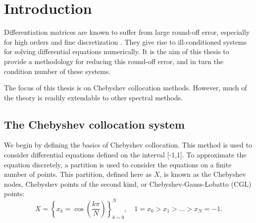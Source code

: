 \documentclass{sfuthesis}
\begin{document}
%
%

\mainmatter%

%


\chapter{Introduction} \label{intro}

Differentiation matrices are known to suffer from large round-off error, especially for high orders and fine discretization \cite{BB1999errors}.
They give rise to ill-conditioned systems for solving differential equations numerically.
It is the aim of this thesis to provide a methodology for reducing this round-off error, and in turn the condition number of these systems.

The focus of this thesis is on Chebyshev collocation methods.
However, much of the theory is readily extendable to other spectral methods.

\section{The Chebyshev collocation system}

We begin by defining the basics of Chebyshev collocation.
This method is used to consider differential equations defined on the interval [-1,1].
To approximate the equation discretely, a partition is used to consider the equations on a finite number of points.
This partition, defined here as $X$, is known as the Chebyshev nodes, Chebyshev points of the second kind, or Chebyshev-Gauss-Lobatto (CGL) points:
\begin{equation} \label{CGL}
X = \left \{ x_k = \cos \left ( \frac{k \pi}{N} \right ) \right \}_{k=0}^N , \quad 1 = x_0 > x_1 > \dots > x_N = -1.
\end{equation}
\end{document}
